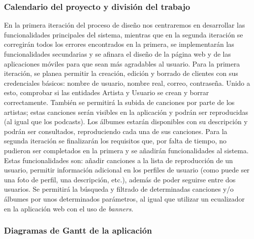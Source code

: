 \documentclass{article}
\begin{document}
\subsubsection{Calendario del proyecto y división del trabajo}
En la primera iteración del proceso de diseño nos centraremos en desarrollar las funcionalidades principales del sistema, mientras que en la segunda iteración se corregirán todos los errores encontrados en la primera, se implementarán las funcionalidades secundarias y se afinara el diseño de la página web y de las aplicaciones móviles para que sean más agradables al usuario. 
\hfill \break
Para la primera iteración, se planea permitir la creación, edición y borrado de clientes con sus credenciales básicos: nombre de usuario, nombre real, correo, contraseña. Unido a esto, comprobar si las entidades Artista y Usuario se crean y borrar correctamente.  También se permitirá la subida de canciones por parte de los artistas; estas canciones serán visibles en la aplicación y podrán ser reproducidas (al igual que los podcasts). Los álbumes estarán disponibles con su descripción y podrán ser consultados, reproduciendo cada una de sus canciones.
\hfill \break
Para la segunda iteración se finalizarán los requisitos que, por falta de tiempo, no pudieron ser completados en la primera y se añadirán funcionalidades al sistema. Estas funcionalidades son: añadir canciones a la lista de reproducción de un usuario, permitir información adicional en los perfiles de usuario (como puede ser una foto de perfil, una descripción, etc.), además de poder seguirse entre dos usuarios. Se permitirá la búsqueda y filtrado de determinadas canciones y/o álbumes por unos determinados parámetros, al igual que utilizar un ecualizador en la aplicación web con el uso de \textit{banners}.


\newpage

\subsubsection{Diagramas de Gantt de la aplicación}
\begin{figure}[H]
	\hspace*{-3.7cm}
\end{figure}
\begin{figure}[H]
	\hspace*{-3.7cm}
\end{figure}
\begin{figure}[H]
	\hspace*{-3.7cm}
\end{figure}
\end{document}
